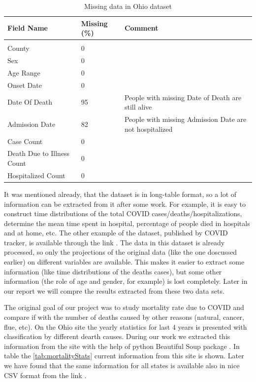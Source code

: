 \documentclass[conference]{IEEEtran}
\begin{document}
\begin{table}[b]
  \centering
  \begin{tabular}{lll}
    \toprule
    Field Name & Missing (\%) & Comment\\
    \midrule\\
    County & 0 & \\
    Sex & 0 & \\
    Age Range & 0 & \\
               Onset Date & 0 & \\
               Date Of Death & 95 & People with missing Date of Death are still alive \\
               Admission Date &  82 & People with missing Admission Date are not hospitalized \\
               Case Count & 0 & \\
               Death Due to Illness Count & 0& \\
               Hospitalized Count & 0 & \\
    \bottomrule
  \end{tabular}
  \caption{Missing data in Ohio dataset}
  \label{tab:Ohio:missing}
\end{table}


It was mentioned already, that the dataset is in long-table format, so a lot of information can be extracted from it after some work. For example, it is easy to construct time distributions of the total COVID cases/deaths/hospitalizations, determine the mean time spent in hospital, percentage of people died in hospitals and at home, etc. The other example of the dataset, published by COVID tracker, is available through the link \cite{covid19tracking_covid_nodate}. The data in this dataset is already processed, so only the projections of the original data (like the one doscussed earlier) on different variables are available. This makes it easier to extract some information (like time distributions of the deaths cases), but some other information (the role of age and gender, for example) is lost completely. Later in our report we will compre the results extracted from these two data sets.

The original goal of our project was to study mortality rate due to COVID and compare if with the number of deaths caused by other reasons (natural, cancer, flue, etc). On the Ohio site \cite{statistics_stats_nodate} the yearly statistics for last 4 years is presented with classification by different dearth causes. During our work we extracted this information from the site with the help of python Beautiful Soup package \cite{team_beautiful_nodate}. In table the \ref{tab:mortalityStats} current information from this site is shown. Later we have found that the same information for all states is available also in nice CSV format from the link \cite{cdc_weekly_nodate}. 
\end{document}

